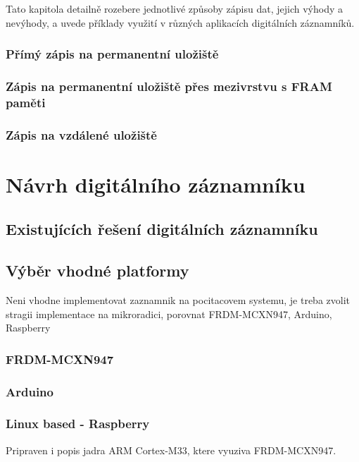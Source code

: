Tato kapitola detailně rozebere jednotlivé způsoby zápisu dat, jejich výhody a nevýhody, a uvede příklady využití v různých aplikacích digitálních záznamníků.

\subsection{Přímý zápis na permanentní uložiště}

\subsection{Zápis na permanentní uložiště přes mezivrstvu s FRAM paměti}

\subsection{Zápis na vzdálené uložiště}

\chapter{Návrh digitálního záznamníku}


\section{Existujících řešení digitálních záznamníku}


\section{Výběr vhodné platformy}
Neni vhodne implementovat zaznamnik na pocitacovem systemu, je treba zvolit stragii implementace na mikroradici, porovnat FRDM-MCXN947, Arduino, Raspberry

\subsection{FRDM-MCXN947}

\subsection{Arduino}

\subsection{Linux based - Raspberry}

Pripraven i popis jadra ARM Cortex-M33, ktere vyuziva FRDM-MCXN947.

